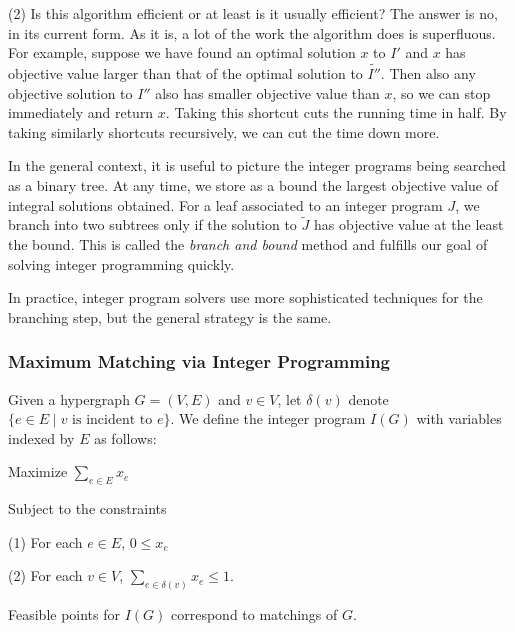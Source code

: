 (2) Is this algorithm efficient or at least is it usually efficient?
The answer is no, in its current form.
As it is, a lot of the work the algorithm does is superfluous.
For example, suppose we have found an optimal solution $x$ to $I'$ and $x$ has objective value larger than that of the optimal solution to $\tilde{I''}$.
Then also any objective solution to $I''$ also has smaller objective value than $x$, so we can stop immediately and return $x$.
Taking this shortcut cuts the running time in half. 
By taking similarly shortcuts recursively, we can cut the time down more.

In the general context, it is useful to picture the integer programs being searched as a binary tree.
At any time, we store as a bound the largest objective value of integral solutions obtained.
For a leaf associated to an integer program $J$, we branch into two subtrees only if the solution to $\tilde{J}$ has objective value at the least the bound.
This is called the \textit{branch and bound} method and fulfills our goal of solving integer programming quickly.

In practice, integer program solvers use more sophisticated techniques for the branching step, but the general strategy is the same.

\subsubsection{Maximum Matching via Integer Programming}\label{MMviaIP}

\begin{definition}\label{I(G)}
    
Given a hypergraph $G = (V, E)$ and $v \in V$, let $\delta(v)$ denote $\{e \in E \mid v \text{ is incident to } e\}$.
We define the integer program $I(G)$ with variables indexed by $E$ as follows:
\begin{center}
Maximize $\sum_{e \in E} x_e$

Subject to the constraints

(1) For each $e \in E$, $0 \leq x_e$

(2) For each $v \in V$, $\sum_{e \in \delta(v)} x_e \leq 1$.

\end{center}
\end{definition}

\begin{lemma}\label{integerlemma}
    Feasible points for $I(G)$ correspond to matchings of $G$.
\end{lemma}

